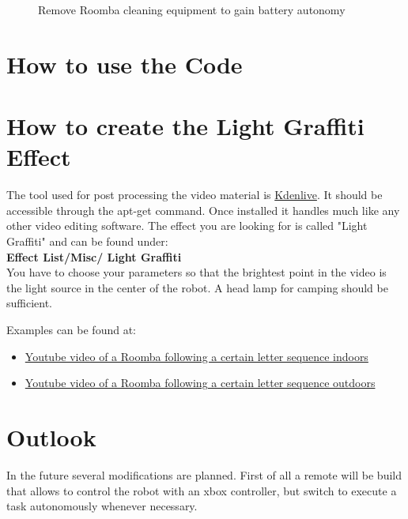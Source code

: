 \documentclass[oneside,12pt,fancychapters]{scrbook} %
\begin{document}
\begin{figure}

\caption{Remove Roomba cleaning equipment to gain battery autonomy}
\label{fig:setup_2}
\end{figure}


\chapter{How to use the Code}
\chapter{How to create the Light Graffiti Effect}
The tool used for post processing the video material is \href{https://kdenlive.org/}{Kdenlive}.
It should be accessible through the apt-get command.
Once installed it handles much like any other video editing software.
The effect you are looking for is called "Light Graffiti" and can be found under:\\
\textbf{Effect List/Misc/ Light Graffiti} \\
You have to choose your parameters so that the brightest point in the video is the light source in the center of the robot.
A head lamp for camping should be sufficient. 


\vspace {0.5cm}

Examples can be found at:

\begin{itemize}
  \item \href{https://youtu.be/hPpPM0kasyk}{Youtube video of a Roomba following a certain letter sequence indoors}
  \item \href{https://youtu.be/g-6yrYu4PUs}{Youtube video of a Roomba following a certain letter sequence outdoors}
\end{itemize}


\chapter{Outlook}
In the future several modifications are planned. 
First of all a remote will be build that allows to control the robot with an xbox controller, but switch to execute a task autonomously whenever 
necessary. 
\end{document}
